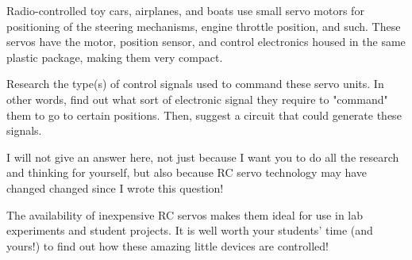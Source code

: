 

Radio-controlled toy cars, airplanes, and boats use small servo motors for positioning of the steering mechanisms, engine throttle position, and such.  These servos have the motor, position sensor, and control electronics housed in the same plastic package, making them very compact.

Research the type(s) of control signals used to command these servo units.  In other words, find out what sort of electronic signal they require to "command" them to go to certain positions.  Then, suggest a circuit that could generate these signals.







I will not give an answer here, not just because I want you to do all the research and thinking for yourself, but also because RC servo technology may have changed changed since I wrote this question!







The availability of inexpensive RC servos makes them ideal for use in lab experiments and student projects.  It is well worth your students' time (and yours!) to find out how these amazing little devices are controlled!




